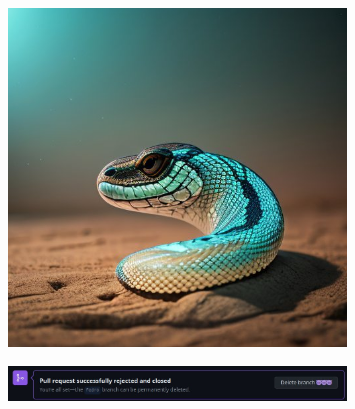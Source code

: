 \documentclass[a4paper]{article}
\begin{document}
\begin{figure}[htbp]
\centering
\includegraphics[width=0.8\textwidth]{meme-half-snake.jpg}

\label{fig:meme-half-snake}
\end{figure}

\begin{figure}[htbp]
\centering
\includegraphics[width=0.8\textwidth]{meme-delete-branch.jpg}

\label{fig:meme-delete-branch}
\end{figure}
\end{document}
